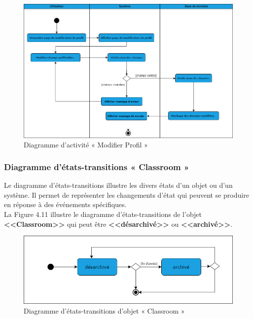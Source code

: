 \begin{figure}[H]
    \centering
    \includegraphics[width=\textwidth]{images/chp4/fig10.png}
    \caption{Diagramme d’activité « Modifier Profil »}
    \label{fig:Diagramme d’activité « Modifier Profil »}    
\end{figure}

\subsubsection{Diagramme d’états-transitions « Classroom »}
\justifying
Le diagramme d'états-transitions illustre les divers états d'un objet ou d'un système. Il permet de représenter les changements d’état qui peuvent se produire en réponse à des événements spécifiques.\\
La Figure 4.11 illustre le diagramme d’états-transitions de l’objet \textbf{<<Classroom>>} qui peut être  \textbf{<<désarchivé>>} ou  \textbf{<<archivé>>}.

\begin{figure}[H]
    \centering
    \includegraphics[width=\textwidth,height=0.28\textwidth]{images/chp4/fig11.png}
    \caption{Diagramme d’états-transitions d'objet « Classroom »}
    \label{fig:Diagramme d’états-transitions d'objet « Classroom »}    
\end{figure}

